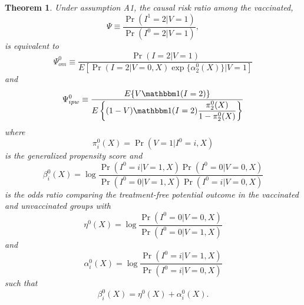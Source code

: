 \documentclass{article}
\newtheorem{theorem}{Theorem}
\begin{document}
\newpage
\begin{theorem}
Under assumption A1, the causal risk ratio among the vaccinated, 
\begin{equation*}
    \Psi \equiv \dfrac{\Pr(I^1=2|V=1)}{\Pr(I^0=2|V=1)},
\end{equation*}
is equivalent to 
\begin{equation}
    \Psi^0_{om} \equiv \dfrac{\Pr(I = 2 | V = 1)}{E\left[\Pr(I = 2 | V = 0, X) \exp\{\alpha^0_2(X)\}\Big| V = 1 \right]}
\end{equation}
and 
\begin{equation}
    \Psi^0_{ipw} \equiv \dfrac{E\{V \mathbbm 1(I = 2)\}}{E\left\{ (1 - V) \mathbbm 1(I = 2) \dfrac{\pi^0_2(X)}{1 - \pi^0_2(X)}\right\}}
\end{equation}
where 
\begin{equation*}
    \pi^0_i(X) = \Pr(V = 1 | I^0 = i, X)
\end{equation*}
is the generalized propensity score and 
\begin{equation*}
    \beta^0_i(X) = \log \dfrac{\Pr(I^0 = i | V = 1, X)\Pr(I^0 = 0 | V = 0, X)}{\Pr(I^0 = 0 | V = 1, X)\Pr(I^0 = i | V = 0, X)}
\end{equation*}
is the odds ratio comparing the treatment-free potential outcome in the vaccinated and unvaccinated groups with 
\begin{equation*}
    \eta^0(X) = \log \dfrac{\Pr(I^0 = 0 | V = 0, X)}{\Pr(I^0 = 0 | V = 1, X)}
\end{equation*}
and 
\begin{equation*}
    \alpha^0_i(X) = \log \dfrac{\Pr(I^0 = i | V = 1, X)}{\Pr(I^0 = i | V = 0, X)}
\end{equation*}
such that
\begin{equation*}
    \beta^0_i(X) = \eta^0(X) + \alpha^0_i(X).
\end{equation*}
\end{theorem}
\end{document}
